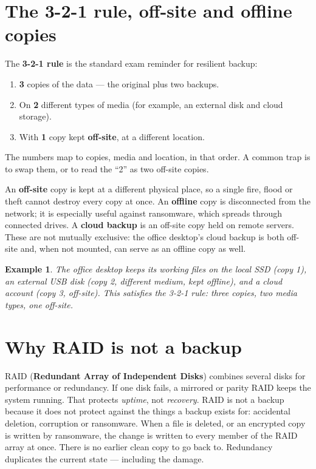 \documentclass[11pt]{article}
\newtheorem{example}{Example}[section]
\begin{document}
\section{The 3-2-1 rule, off-site and offline copies}
The \textbf{3-2-1 rule} is the standard exam reminder for resilient backup:
\begin{enumerate}
  \item \textbf{3} copies of the data --- the original plus two backups.
  \item On \textbf{2} different types of media (for example, an external disk
    and cloud storage).
  \item With \textbf{1} copy kept \textbf{off-site}, at a different location.
\end{enumerate}
The numbers map to copies, media and location, in that order. A common trap
is to swap them, or to read the ``2'' as two off-site copies.

An \textbf{off-site} copy is kept at a different physical place, so a single
fire, flood or theft cannot destroy every copy at once. An \textbf{offline}
copy is disconnected from the network; it is especially useful against
ransomware, which spreads through connected drives. A \textbf{cloud backup}
is an off-site copy held on remote servers. These are not mutually exclusive:
the office desktop's cloud backup is both off-site and, when not mounted, can
serve as an offline copy as well.

\begin{example}
The office desktop keeps its working files on the local SSD (copy 1), an
external USB disk (copy 2, different medium, kept offline), and a cloud
account (copy 3, off-site). This satisfies the 3-2-1 rule: three copies, two
media types, one off-site.
\end{example}

\section{Why RAID is not a backup}
RAID (\textbf{Redundant Array of Independent Disks}) combines several disks
for performance or redundancy. If one disk fails, a mirrored or parity RAID
keeps the system running. That protects \emph{uptime}, not \emph{recovery}.
RAID is not a backup because it does not protect against the things a backup
exists for: accidental deletion, corruption or ransomware. When a file is
deleted, or an encrypted copy is written by ransomware, the change is written
to every member of the RAID array at once. There is no earlier clean copy to
go back to. Redundancy duplicates the current state --- including the damage.
\end{document}
